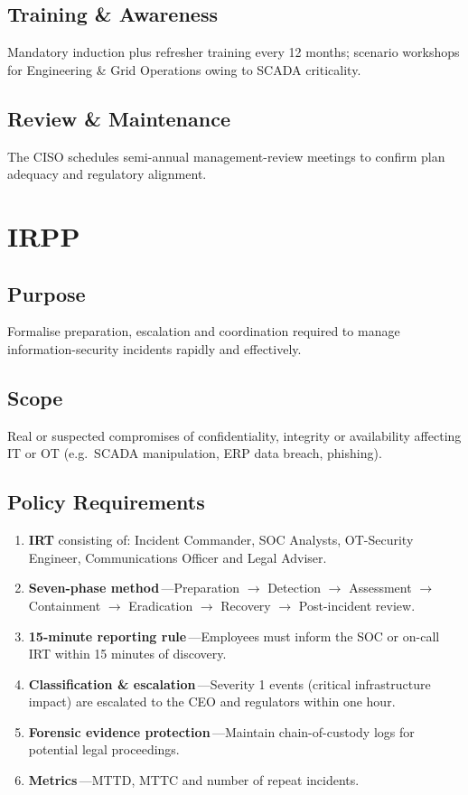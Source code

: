 \subsection*{Training \& Awareness}
Mandatory induction plus refresher training every 12 months; scenario
workshops for Engineering \& Grid Operations owing to \ac{SCADA} criticality.

\subsection*{Review \& Maintenance}
The CISO schedules semi-annual management-review meetings to confirm plan
adequacy and regulatory alignment.

\section{\ac{IRPP}}
\label{sec:IRPP}
\subsection*{Purpose}
Formalise preparation, escalation and coordination required to manage
information-security incidents rapidly and effectively.

\subsection*{Scope}
Real or suspected compromises of confidentiality, integrity or availability
affecting IT or OT (e.g.\ \ac{SCADA} manipulation, ERP data breach, phishing).

\subsection*{Policy Requirements}
\begin{enumerate}[label=\arabic*.]
  \item \textbf{\ac{IRT}} consisting of: Incident
        Commander, SOC Analysts, OT-Security Engineer, Communications
        Officer and Legal Adviser.
  \item \textbf{Seven-phase method}\,—Preparation $\rightarrow$ Detection
        $\rightarrow$ Assessment $\rightarrow$ Containment
        $\rightarrow$ Eradication $\rightarrow$ Recovery
        $\rightarrow$ Post-incident review.
  \item \textbf{15-minute reporting rule}\,—Employees must inform the SOC or
        on-call \ac{IRT} within 15 minutes of discovery.
  \item \textbf{Classification \& escalation}\,—Severity 1 events (critical
        infrastructure impact) are escalated to the CEO and regulators
        within one hour.
  \item \textbf{Forensic evidence protection}\,—Maintain chain-of-custody
        logs for potential legal proceedings.
  \item \textbf{Metrics}\,—MTTD, MTTC and number of repeat incidents.
\end{enumerate}

